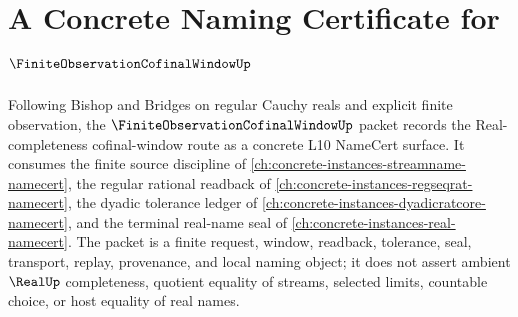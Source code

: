 \chapter{A Concrete Naming Certificate for $\FiniteObservationCofinalWindowUp$}
\label{ch:concrete-instances-finite-observation-cofinal-window-namecert}

Following Bishop and Bridges on regular Cauchy reals and explicit finite observation, the $\FiniteObservationCofinalWindowUp$ packet records the Real-completeness cofinal-window route as a concrete L10 NameCert surface. It consumes the finite source discipline of \autoref{ch:concrete-instances-streamname-namecert}, the regular rational readback of \autoref{ch:concrete-instances-regseqrat-namecert}, the dyadic tolerance ledger of \autoref{ch:concrete-instances-dyadicratcore-namecert}, and the terminal real-name seal of \autoref{ch:concrete-instances-real-namecert}. The packet is a finite request, window, readback, tolerance, seal, transport, replay, provenance, and local naming object; it does not assert ambient $\RealUp$ completeness, quotient equality of streams, selected limits, countable choice, or host equality of real names.

